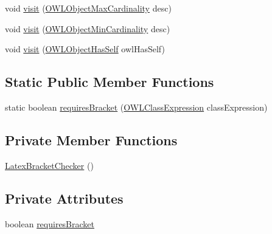 \begin{DoxyCompactItemize}
\item 
void \hyperlink{classorg_1_1coode_1_1owlapi_1_1latex_1_1_latex_bracket_checker_aa7c8f9f2f3be4ba1c32c2064796d4fc9}{visit} (\hyperlink{interfaceorg_1_1semanticweb_1_1owlapi_1_1model_1_1_o_w_l_object_max_cardinality}{O\-W\-L\-Object\-Max\-Cardinality} desc)
\item 
void \hyperlink{classorg_1_1coode_1_1owlapi_1_1latex_1_1_latex_bracket_checker_a77d7cdb452b41266ee3af648a2d7cd1e}{visit} (\hyperlink{interfaceorg_1_1semanticweb_1_1owlapi_1_1model_1_1_o_w_l_object_min_cardinality}{O\-W\-L\-Object\-Min\-Cardinality} desc)
\item 
void \hyperlink{classorg_1_1coode_1_1owlapi_1_1latex_1_1_latex_bracket_checker_aa4f1be0cd66e5bf256f8b3b4c880e575}{visit} (\hyperlink{interfaceorg_1_1semanticweb_1_1owlapi_1_1model_1_1_o_w_l_object_has_self}{O\-W\-L\-Object\-Has\-Self} owl\-Has\-Self)
\end{DoxyCompactItemize}
\subsection*{Static Public Member Functions}
\begin{DoxyCompactItemize}
\item 
static boolean \hyperlink{classorg_1_1coode_1_1owlapi_1_1latex_1_1_latex_bracket_checker_a80e867585c603705c77c036dd2b9a4d8}{requires\-Bracket} (\hyperlink{interfaceorg_1_1semanticweb_1_1owlapi_1_1model_1_1_o_w_l_class_expression}{O\-W\-L\-Class\-Expression} class\-Expression)
\end{DoxyCompactItemize}
\subsection*{Private Member Functions}
\begin{DoxyCompactItemize}
\item 
\hyperlink{classorg_1_1coode_1_1owlapi_1_1latex_1_1_latex_bracket_checker_a7228006a4462640f6835e91a1c49ad50}{Latex\-Bracket\-Checker} ()
\end{DoxyCompactItemize}
\subsection*{Private Attributes}
\begin{DoxyCompactItemize}
\item 
boolean \hyperlink{classorg_1_1coode_1_1owlapi_1_1latex_1_1_latex_bracket_checker_a1af27ddbff20f4dc7130d02991fff379}{requires\-Bracket}
\end{DoxyCompactItemize}
